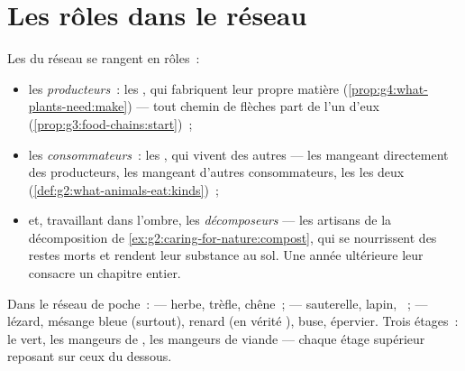 \section{Les rôles dans le réseau}

\begin{definition}\label{def:g5:food-webs:roles}
Les  du réseau se rangent en rôles~:
\begin{itemize}
  \item les \emph{producteurs}~: les , qui
        fabriquent leur propre matière
        (\cref{prop:g4:what-plants-need:make}) --- tout chemin de
        flèches part de l'un d'eux
        (\cref{prop:g3:food-chains:start})~;
  \item les \emph{consommateurs}~: les ,
        qui vivent des autres --- les  mangeant
        directement des producteurs, les  mangeant
        d'autres consommateurs, les  les deux
        (\cref{def:g2:what-animals-eat:kinds})~;
  \item et, travaillant dans l'ombre, les
        \emph{décomposeurs} --- les artisans de
        la décomposition de
        \cref{ex:g2:caring-for-nature:compost}, qui se nourrissent
        des restes morts et rendent leur substance au sol. Une
        année ultérieure leur consacre un chapitre entier.
\end{itemize}
\end{definition}

\begin{example}\label{ex:g5:food-webs:sorting}
Dans le réseau de poche~:  --- herbe, trèfle, chêne~;
  --- sauterelle, lapin, ~;
  --- lézard, mésange bleue (surtout), renard
(en vérité ), buse, épervier. Trois étages~: le vert, les
mangeurs de , les mangeurs de viande --- chaque étage
supérieur reposant sur ceux du dessous.
\end{example}

